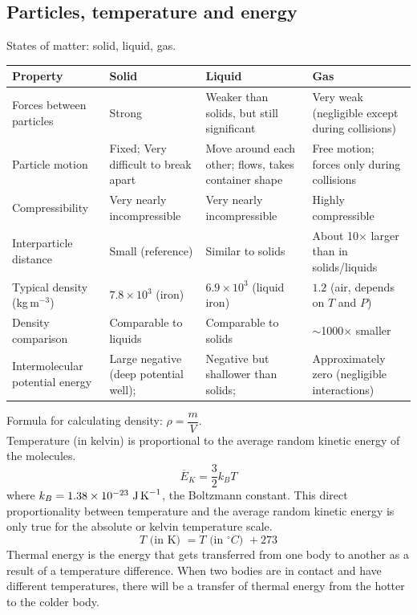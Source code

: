 \subsection{Particles, temperature and energy}
States of matter: solid, liquid, gas.
\begin{center}
\begin{tabularx}{\textwidth}{@{}|Y |Y |Y| Y|@{}}
\toprule
\textbf{Property} & \textbf{Solid} & \textbf{Liquid} & \textbf{Gas} \\
\midrule
Forces between particles & Strong & Weaker than solids, but still significant & Very weak (negligible except during collisions) \\\hline
Particle motion & Fixed; Very difficult to break apart & Move around each other; flows, takes container shape & Free motion; forces only during collisions \\\hline
Compressibility & Very nearly incompressible & Very nearly incompressible & Highly compressible \\\hline
Interparticle distance & Small (reference) & Similar to solids & About 10× larger than in solids/liquids \\\hline
Typical density (kg\,m$^{-3}$) & $7.8\times10^3$ (iron) & $6.9\times10^3$ (liquid iron) & $1.2$ (air, depends on $T$ and $P$) \\\hline
Density comparison & Comparable to liquids & Comparable to solids & $\sim$1000× smaller \\\hline
Intermolecular potential energy & Large negative (deep potential well); & Negative but shallower than solids; & Approximately zero (negligible interactions) \\
\bottomrule
\end{tabularx}
\end{center}
Formula for calculating density: $\rho=\dfrac{m}{V}$. \\
Temperature (in kelvin) is proportional to the average random kinetic energy of the molecules.
\[\overline{E}_K=\dfrac{3}{2}k_BT\]
where $k_B=1.38\times 10^{-23}\ \text{J\,K}^{-1}$, the Boltzmann constant. This direct proportionality between temperature and the average random kinetic energy is only true for the absolute or kelvin temperature scale.\\
\[T\text{ (in K) }=T\text{ (in $^\circ C$) }+273\]
Thermal energy is the energy that gets transferred from one body to another as a result of a temperature difference.
When two bodies are in contact and have different temperatures, there will be a transfer of thermal energy from the hotter to the colder body.
